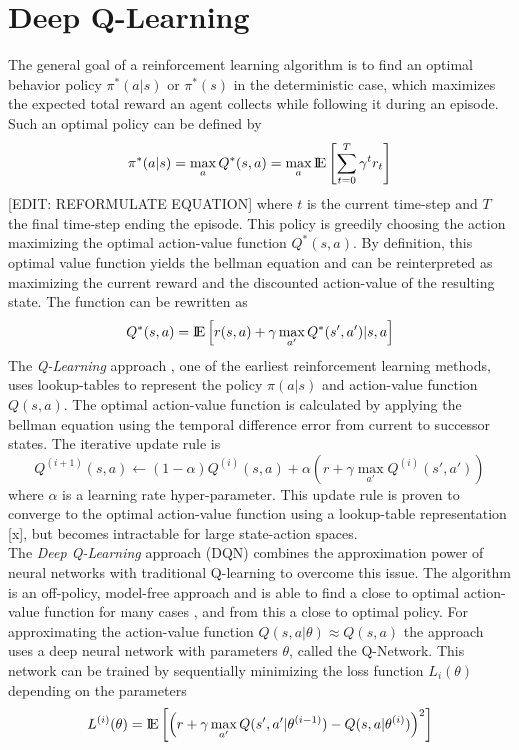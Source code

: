 \section{Deep Q-Learning}
\label{sec:pre}
The general goal of a reinforcement learning algorithm is to find an optimal behavior policy $\pi^*(a|s)$ or $\pi^*(s)$ in the deterministic case, which maximizes the expected total reward an agent collects while following it during an episode. Such an optimal policy can be defined by 
\[ 
\pi^*(a|s)=\max_a Q^*(s,a)=\max_a {\rm I\!E} \left[
\sum_{t=0}^{T}\gamma^{t}r_t\right] 
\]
[EDIT: REFORMULATE EQUATION]
where $t$ is the current time-step and $T$ the final time-step ending the episode.
This policy is greedily choosing the action maximizing the optimal action-value function $Q^*(s,a)$. By definition, this optimal value function yields the bellman equation \citep{sutton2018reinforcement} and can be reinterpreted as maximizing the current reward and the discounted action-value of the resulting state. The function can be rewritten as
\[
Q^*(s,a) = {\rm I\!E} \left[
r(s,a) + \gamma \max_{a'}Q^*(s',a')|s,a \right]
\]
The \textit{Q-Learning} approach \citep{watkins1992q}, one of the earliest reinforcement learning methods, uses lookup-tables to represent the policy $\pi(a|s)$ and action-value function $Q(s,a)$. The optimal action-value function is calculated by applying the bellman equation using the temporal difference error from current to successor states. The iterative update rule is 
\[
Q^{(i+1)}(s,a) \leftarrow (1-\alpha) Q^{(i)}(s,a) + \alpha \left( r + \gamma \max_{a'} Q^{(i)}(s',a') \right)
\]
where $\alpha$ is a learning rate hyper-parameter. This update rule is proven to converge to the optimal action-value function using a lookup-table representation [x], but becomes intractable for large state-action spaces. \\
The \textit{Deep Q-Learning} approach (DQN) \citep{mnih2013playing} combines the approximation power of neural networks with traditional Q-learning to overcome this issue. The algorithm is an off-policy, model-free approach and is able to find a close to optimal action-value function for many cases \citep{mnih2015human}, and from this a close to optimal policy. For approximating the action-value function $Q(s,a|\theta)\approx Q(s,a)$ the approach uses a deep neural network with parameters $\theta$, called the Q-Network.
This network can be trained by sequentially minimizing the loss function $L_i(\theta)$ depending on the parameters
\[
L^{(i)}(\theta)={\rm I\!E} \left[\left(r+\gamma \max_{a'} Q(s',a'|\theta^{(i-1)})-Q(s,a|\theta^{(i)})\right)^2\right] 
\]
